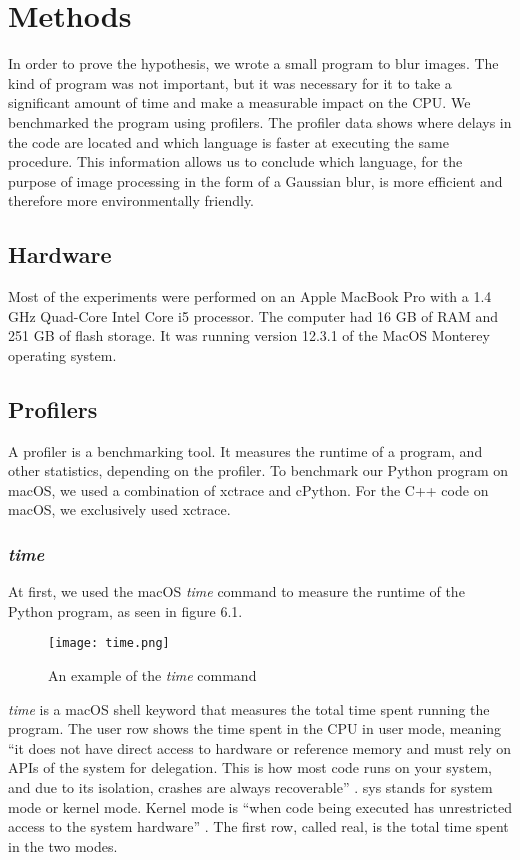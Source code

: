 \chapter{Methods}
In order to prove the hypothesis, we wrote a small program to blur images. The kind of program was not important, but it was necessary for it to take a significant amount of time and make a measurable impact on the CPU.
We benchmarked the program using profilers. The profiler data shows where delays in the code are located and which language is faster at executing the same procedure. This information allows us to conclude which language, for the purpose of image processing in the form of a Gaussian blur, is more efficient and therefore more environmentally friendly.

\section{Hardware}
Most of the experiments were performed on an Apple MacBook Pro with a 1.4 GHz Quad-Core Intel Core i5 processor. The computer had 16 GB of RAM and 251 GB of flash storage. It was running version 12.3.1 of the MacOS Monterey operating system.

\section{Profilers}
A profiler is a benchmarking tool. It measures the runtime of a program, and other statistics, depending on the profiler. To benchmark our Python program on macOS, we used a combination of xctrace and cPython. For the C++ code on macOS, we exclusively used xctrace.

\subsection{\textit{time}}
At first, we used the macOS \textit{time} command to measure the runtime of the Python program, as seen in figure 6.1.

\begin{figure}[htbp]
	\centering
	\texttt{[image: time.png]}
	\caption{An example of the \textit{time} command}
	\label{figure:time}
\end{figure}

\textit{time} is a macOS shell keyword that measures the total time spent running the program. The user row shows the time spent in the CPU in user mode, meaning “it does not have direct access to hardware or reference memory and must rely on APIs of the system for delegation. This is how most code runs on your system, and due to its isolation, crashes are always recoverable” \cite{time}. sys stands for system mode or kernel mode. Kernel mode is “when code being executed has unrestricted access to the system hardware” \cite{time}. The first row, called real, is the total time spent in the two modes.

